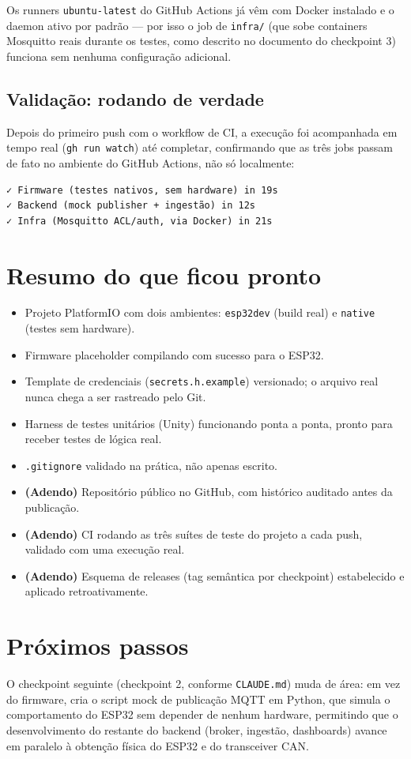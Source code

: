 \documentclass[11pt,a4paper]{article}
\begin{document}
Os runners \texttt{ubuntu-latest} do GitHub Actions já vêm com Docker instalado e o daemon ativo por padrão --- por isso o job de \texttt{infra/} (que sobe containers Mosquitto reais durante os testes, como descrito no documento do checkpoint 3) funciona sem nenhuma configuração adicional.

\subsection{Validação: rodando de verdade}

Depois do primeiro push com o workflow de CI, a execução foi acompanhada em tempo real (\texttt{gh run watch}) até completar, confirmando que as três jobs passam de fato no ambiente do GitHub Actions, não só localmente:

\begin{lstlisting}[caption={Resultado real do primeiro run de CI}]
✓ Firmware (testes nativos, sem hardware) in 19s
✓ Backend (mock publisher + ingestão) in 12s
✓ Infra (Mosquitto ACL/auth, via Docker) in 21s
\end{lstlisting}

\section{Resumo do que ficou pronto}

\begin{itemize}
    \item Projeto PlatformIO com dois ambientes: \texttt{esp32dev} (build real) e \texttt{native} (testes sem hardware).
    \item Firmware placeholder compilando com sucesso para o ESP32.
    \item Template de credenciais (\texttt{secrets.h.example}) versionado; o arquivo real nunca chega a ser rastreado pelo Git.
    \item Harness de testes unitários (Unity) funcionando ponta a ponta, pronto para receber testes de lógica real.
    \item \texttt{.gitignore} validado na prática, não apenas escrito.
    \item \textbf{(Adendo)} Repositório público no GitHub, com histórico auditado antes da publicação.
    \item \textbf{(Adendo)} CI rodando as três suítes de teste do projeto a cada push, validado com uma execução real.
    \item \textbf{(Adendo)} Esquema de releases (tag semântica por checkpoint) estabelecido e aplicado retroativamente.
\end{itemize}

\section{Próximos passos}

O checkpoint seguinte (checkpoint 2, conforme \texttt{CLAUDE.md}) muda de área: em vez do firmware, cria o script mock de publicação MQTT em Python, que simula o comportamento do ESP32 sem depender de nenhum hardware, permitindo que o desenvolvimento do restante do backend (broker, ingestão, dashboards) avance em paralelo à obtenção física do ESP32 e do transceiver CAN.
\end{document}
